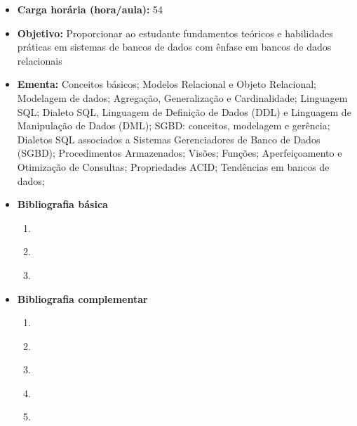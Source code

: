 \documentclass[11pt,fleqn]{book} %
\begin{document}
\begin{itemize}
	\item \textbf{Carga horária (hora/aula):} 54
	\item \textbf{Objetivo:} Proporcionar ao estudante fundamentos teóricos e habilidades práticas em sistemas de bancos de dados com ênfase em bancos de dados relacionais
	\item \textbf{Ementa:} 
	Conceitos básicos;
	Modelos Relacional e Objeto Relacional;
	Modelagem de dados; 
	Agregação, Generalização e Cardinalidade; 
	Linguagem SQL; 
	Dialeto SQL, Linguagem de Definição de Dados (DDL) e Linguagem de Manipulação de Dados (DML);
	SGBD: conceitos, modelagem e gerência;
	Dialetos SQL associados a Sistemas Gerenciadores de Banco de Dados (SGBD);
	Procedimentos Armazenados; 
	Visões; 
	Funções; 
	Aperfeiçoamento e Otimização de Consultas;
	Propriedades ACID;
	Tendências em bancos de dados;
	\item \textbf{Bibliografia básica}
	\begin{enumerate}
		\item~\cite{silberschatz2016}
		\item~\cite{date2004}
		\item~\cite{heuser2009}
	\end{enumerate}
	\item \textbf{Bibliografia complementar}
	\begin{enumerate}
		\item~\cite{sadalage2019}
		\item~\cite{casanova2005}
		\item~\cite{milani2008}
		\item \cite{elmasri_navathe_2011}
		\item \cite{machado_2014}
	\end{enumerate}	
\end{itemize}


\newpage
\end{document}
